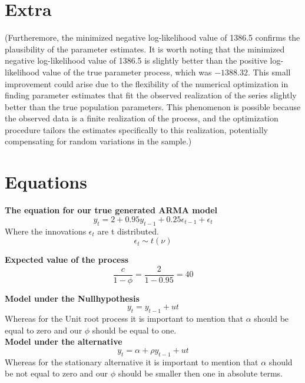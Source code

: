 \documentclass[11pt]{article}
\begin{document}
\section{Extra}
(Furtheremore, the minimized negative log-likelihood value of 1386.5 confirms the plausibility of the parameter estimates. It is worth noting that the minimized negative log-likelihood value of 1386.5 is slightly better than the positive log-likelihood value of the true parameter process, which was \(-1388.32\). This small improvement could arise due to the flexibility of the numerical optimization in finding parameter estimates that fit the observed realization of the series slightly better than the true population parameters. This phenomenon is possible because the observed data is a finite realization of the process, and the optimization procedure tailors the estimates specifically to this realization, potentially compensating for random variations in the sample.)




\newpage
\section{Equations}
\textbf{The equation for our true generated ARMA model}
\begin{equation}
    y_t = 2 + 0.95y_{t-1} + 0.25\epsilon_{t-1} + \epsilon_t
\label{eq:arma}
\end{equation}
Where the innovations $\epsilon_t$ are t distributed.
 \begin{equation}
     \epsilon_t \sim t(\nu) 
 \end{equation}



 \textbf{Expected value of the process}
 \begin{equation}
\frac{c}{1-\phi} = \frac{2}{1-0.95} = 40
\label{eq:Mean}
\end{equation}

\textbf{Model under the Nullhypothesis}
\begin{equation}
    y_t = y_{t-1} + ut
    \label{eq:true}
\end{equation}
Whereas for the Unit root process it is important to mention that $\alpha$ should be equal to zero and our $\phi$ should be equal to one.\\

\textbf{Model under the alternative}
\begin{equation}
    y_t = \alpha + \rho y_{t-1} + ut
    \label{eq:alternative}
\end{equation}
Whereas for the stationary alternative it is important to mention that $\alpha$ should be not equal to zero and our $\phi$ should be smaller then one in absolute terms.\\
\end{document}
